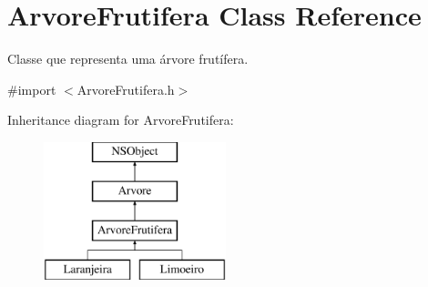 \hypertarget{interface_arvore_frutifera}{}\section{Arvore\+Frutifera Class Reference}
\label{interface_arvore_frutifera}


Classe que representa uma árvore frutífera.  




{\ttfamily \#import $<$Arvore\+Frutifera.\+h$>$}

Inheritance diagram for Arvore\+Frutifera\+:\begin{figure}[H]
\begin{center}
\leavevmode
\includegraphics[height=4.000000cm]{interface_arvore_frutifera}
\end{center}
\end{figure}
